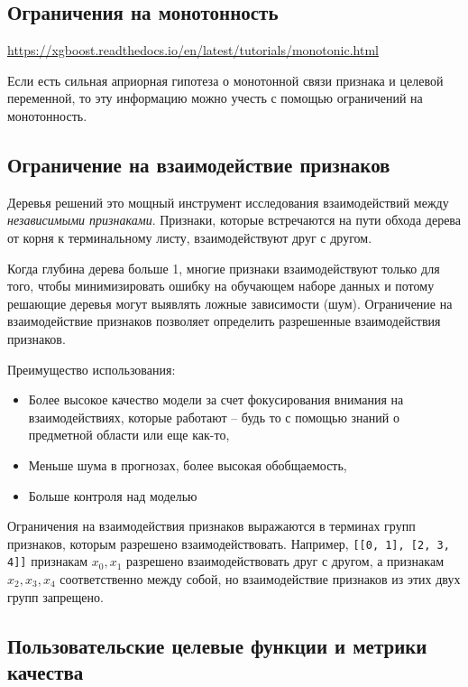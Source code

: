 \documentclass[%
	11pt,
	a4paper,
	utf8,
		]{article}
\begin{document}
\subsection{Ограничения на монотонность}

\url{https://xgboost.readthedocs.io/en/latest/tutorials/monotonic.html}

Если есть сильная априорная гипотеза о монотонной связи признака и целевой переменной, то эту информацию можно учесть с помощью ограничений на монотонность.

\subsection{Ограничение на взаимодействие признаков}

Деревья решений это мощный инструмент исследования взаимодействий между \emph{независимыми признаками}. Признаки, которые встречаются на пути обхода дерева от корня к терминальному листу, взаимодействуют друг с другом.

Когда глубина дерева больше 1, многие признаки взаимодействуют только для того, чтобы минимизировать ошибку на обучающем наборе данных и потому решающие деревья могут выявлять ложные зависимости (шум). Ограничение на взаимодействие признаков позволяет определить разрешенные взаимодействия признаков.

Преимущество использования:
\begin{itemize}
	\item Более высокое качество модели за счет фокусирования внимания на взаимодействиях, которые работают -- будь то с помощью знаний о предметной области или еще как-то,
	
	\item Меньше шума в прогнозах, более высокая обобщаемость,
	
	\item Больше контроля над моделью
\end{itemize}

Ограничения на взаимодействия признаков выражаются в терминах групп признаков, которым разрешено взаимодействовать. Например, \verb|[[0, 1], [2, 3, 4]]| признакам $ x_0, x_1 $ разрешено взаимодействовать друг с другом, а признакам $ x_2, x_3, x_4 $ соответственно между собой, но взаимодействие признаков из этих двух групп запрещено.


\subsection{Пользовательские целевые функции и метрики качества}
\end{document}
